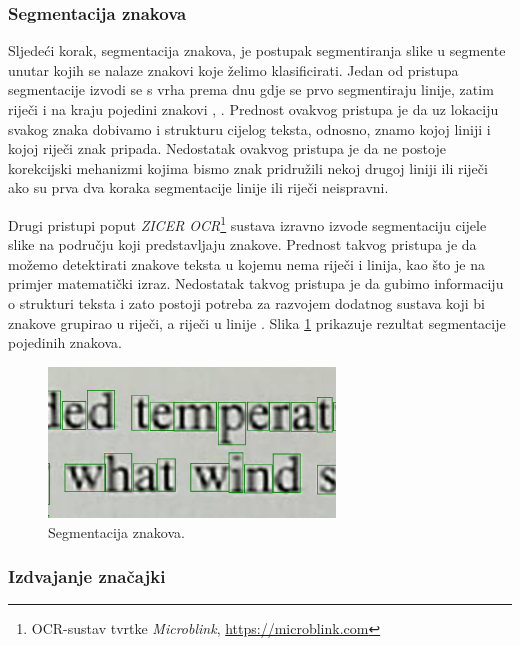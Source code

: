 \documentclass[times, utf8, zavrsni]{fer}
\begin{document}
\subsubsection{Segmentacija znakova}
\label{subsubsec:segmentacija}

Sljedeći korak, segmentacija znakova, je postupak segmentiranja slike u segmente unutar kojih se nalaze znakovi
koje želimo klasificirati. Jedan od pristupa segmentacije izvodi se s vrha prema dnu gdje se prvo
segmentiraju linije, zatim riječi i na kraju pojedini znakovi \citep{Jurin:2017:Master}, \citep{Vynckier:2018:HowOcrWorks}.
Prednost ovakvog pristupa je da uz lokaciju svakog znaka dobivamo i strukturu cijelog teksta, odnosno, znamo kojoj
liniji i kojoj riječi znak pripada. Nedostatak ovakvog pristupa je da ne postoje korekcijski mehanizmi kojima bismo
znak pridružili nekoj drugoj liniji ili riječi ako su prva dva koraka segmentacije linije ili riječi neispravni. \citep{Jurin:2017:Master}

Drugi pristupi poput \emph{ZICER OCR}\footnote{OCR-sustav tvrtke \emph{Microblink}, \url{https://microblink.com}} sustava izravno
izvode segmentaciju cijele slike na području koji predstavljaju znakove. Prednost takvog pristupa je da
možemo detektirati znakove teksta u kojemu nema riječi i linija, kao što je na primjer matematički izraz.
Nedostatak takvog pristupa je da gubimo informaciju o strukturi teksta i zato postoji potreba za razvojem dodatnog sustava koji bi znakove
grupirao u riječi, a riječi u linije \citep{Jurin:2017:Master}.
Slika \ref{fig:segmentation} prikazuje rezultat segmentacije pojedinih znakova.

\begin{figure}[htb]
    \centering
    \includegraphics[height=4cm]{images/segmentation.png}
    \caption{Segmentacija znakova.}
    \label{fig:segmentation}
\end{figure}

\pagebreak

\subsubsection{Izdvajanje značajki}
\end{document}
